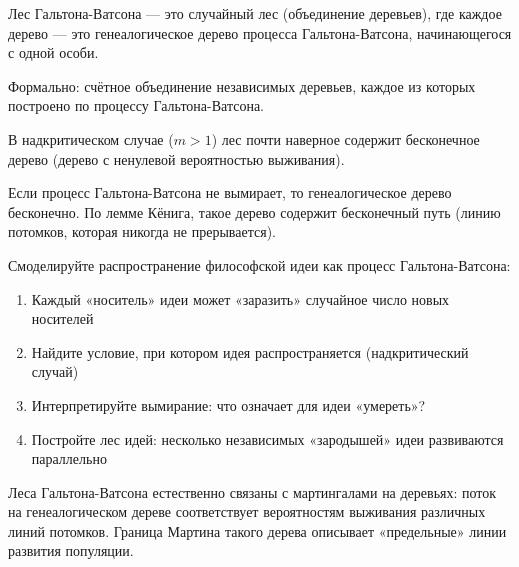 \documentclass[11pt, a4paper]{extarticle}
\begin{document}
\begin{definition}
Лес Гальтона-Ватсона --- это случайный лес (объединение деревьев), где каждое дерево --- это генеалогическое дерево процесса Гальтона-Ватсона, начинающегося с одной особи.

Формально: счётное объединение независимых деревьев, каждое из которых построено по процессу Гальтона-Ватсона.
\end{definition}

\begin{theorem}
В надкритическом случае ($m > 1$) лес почти наверное содержит бесконечное дерево (дерево с ненулевой вероятностью выживания).
\end{theorem}

\begin{theorem}
Если процесс Гальтона-Ватсона не вымирает, то генеалогическое дерево бесконечно. По лемме Кёнига, такое дерево содержит бесконечный путь (линию потомков, которая никогда не прерывается).
\end{theorem}

\begin{exercise}
Смоделируйте распространение философской идеи как процесс Гальтона-Ватсона:
\begin{enumerate}
    \item Каждый «носитель» идеи может «заразить» случайное число новых носителей
    \item Найдите условие, при котором идея распространяется (надкритический случай)
    \item Интерпретируйте вымирание: что означает для идеи «умереть»?
    \item Постройте лес идей: несколько независимых «зародышей» идеи развиваются параллельно
\end{enumerate}
\end{exercise}

\begin{remark}
Леса Гальтона-Ватсона естественно связаны с мартингалами на деревьях: поток на генеалогическом дереве соответствует вероятностям выживания различных линий потомков. Граница Мартина такого дерева описывает «предельные» линии развития популяции.
\end{remark}
\end{document}
